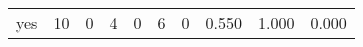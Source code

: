 \begin{longtable}{lp{1.3cm}p{1.3cm}p{1.3cm}p{1.3cm}p{1.3cm}p{1.3cm}p{1.3cm}p{1.3cm}p{1.3cm}}
yes       &                     10 &                                             0 &                                            4 &                                           0 &                                            6 &                                          0 &                                0.550 &                                  1.000 &                                0.000 \\
\end{longtable}
